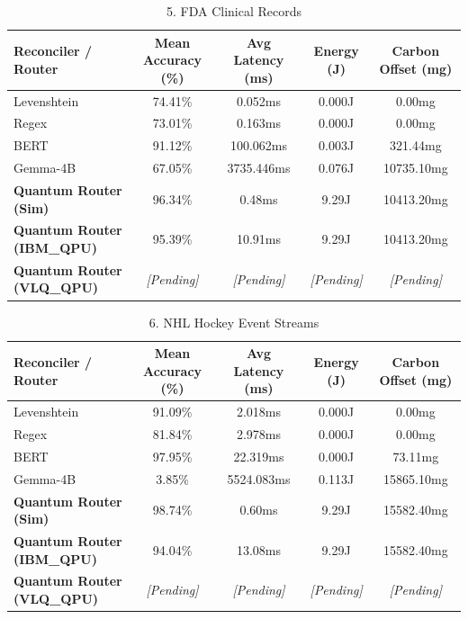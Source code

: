 
\begin{table}[htbp]
  \centering
  \caption{5. FDA Clinical Records}
  \label{tab:5__fda_clinical_records}
  \begin{tabular}{lcccc}
    \hline
    \textbf{Reconciler / Router} & \textbf{Mean Accuracy (\%)} & \textbf{Avg Latency (ms)} & \textbf{Energy (J)} & \textbf{Carbon Offset (mg)} \\
    \hline
    Levenshtein & 74.41\% & 0.052ms & 0.000J & 0.00mg \\
    Regex & 73.01\% & 0.163ms & 0.000J & 0.00mg \\
    BERT & 91.12\% & 100.062ms & 0.003J & 321.44mg \\
    Gemma-4B & 67.05\% & 3735.446ms & 0.076J & 10735.10mg \\
    \textbf{Quantum Router (Sim)} & 96.34\% & 0.48ms & 9.29J & 10413.20mg \\
    \textbf{Quantum Router (IBM\_QPU)} & 95.39\% & 10.91ms & 9.29J & 10413.20mg \\
    \textbf{Quantum Router (VLQ\_QPU)} & \textit{[Pending]} & \textit{[Pending]} & \textit{[Pending]} & \textit{[Pending]} \\
    \hline
  \end{tabular}
\end{table}



\begin{table}[htbp]
  \centering
  \caption{6. NHL Hockey Event Streams}
  \label{tab:6__nhl_hockey_event_streams}
  \begin{tabular}{lcccc}
    \hline
    \textbf{Reconciler / Router} & \textbf{Mean Accuracy (\%)} & \textbf{Avg Latency (ms)} & \textbf{Energy (J)} & \textbf{Carbon Offset (mg)} \\
    \hline
    Levenshtein & 91.09\% & 2.018ms & 0.000J & 0.00mg \\
    Regex & 81.84\% & 2.978ms & 0.000J & 0.00mg \\
    BERT & 97.95\% & 22.319ms & 0.000J & 73.11mg \\
    Gemma-4B & 3.85\% & 5524.083ms & 0.113J & 15865.10mg \\
    \textbf{Quantum Router (Sim)} & 98.74\% & 0.60ms & 9.29J & 15582.40mg \\
    \textbf{Quantum Router (IBM\_QPU)} & 94.04\% & 13.08ms & 9.29J & 15582.40mg \\
    \textbf{Quantum Router (VLQ\_QPU)} & \textit{[Pending]} & \textit{[Pending]} & \textit{[Pending]} & \textit{[Pending]} \\
    \hline
  \end{tabular}
\end{table}


